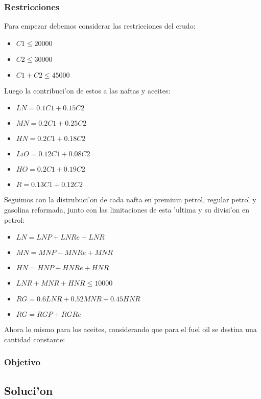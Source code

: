 \subsubsection{Restricciones}
Para empezar debemos considerar las restricciones del crudo:
\begin{itemize}
\item$C1 \leq 20000$
\item$C2 \leq 30000$
\item$C1 + C2 \leq 45000$
\end{itemize}
Luego la contribuci'on de estos a las naftas y aceites:
\begin{itemize}
\item$LN = 0.1C1 + 0.15C2$
\item$MN = 0.2C1 + 0.25C2$
\item$HN = 0.2C1 + 0.18C2$
\item$LiO = 0.12C1 + 0.08C2$
\item$HO = 0.2C1 + 0.19C2$
\item$R = 0.13C1 + 0.12C2$
\end{itemize}
Seguimos con la distrubuci'on de cada nafta en premium petrol, regular petrol y gasolina reformada, junto con las limitaciones de esta 'ultima y su divisi'on en petrol:
\begin{itemize}
\item$LN = LNP + LNRe + LNR$
\item$MN = MNP + MNRe + MNR$
\item$HN = HNP + HNRe + HNR$
\item$LNR + MNR+ HNR \leq 10000$
\item$RG = 0.6LNR + 0.52MNR+ 0.45HNR$
\item$RG = RGP + RGRe$
\end{itemize}
Ahora lo mismo para los aceites, considerando que para el fuel oil se destina una cantidad constante:
\subsubsection{Objetivo}
\subsection{Soluci'on}